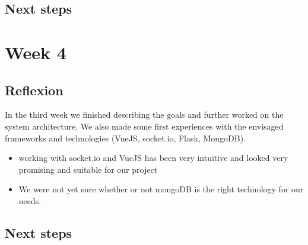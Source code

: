\subsection{Next steps}

\section{Week 4}
\subsection{Reflexion}

In the third week we finished describing the goals and further worked on the
system architecture. We also made some first experiences with the envisaged
frameworks and technologies (VueJS, socket.io, Flask, MongoDB).

\begin{itemize}
\item working with socket.io and VueJS has been very intuitive and looked very promising and suitable for our project
\item We were not yet sure whether or not mongoDB is the right technology for our needs.
\end{itemize}

\subsection{Next steps}
